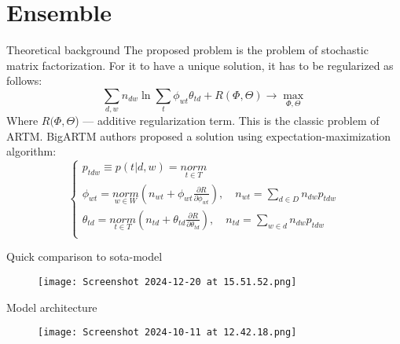 \documentclass[10pt,pdf,hyperref={unicode}]{beamer}
\begin{document}
\section{Ensemble}
\begin{frame}{Theoretical background}
    The proposed problem is the problem of stochastic matrix factorization. For it to have a unique solution, it has to be regularized as follows:
\begin{equation}
    \sum_{d, w} n_{dw} \ln \sum_{t} \phi_{wt}\theta_{td} + R(\Phi, \Theta) \rightarrow \max_{\Phi, \Theta}
    \label{likelihood}
\end{equation}
Where $R(\Phi, \Theta$) --- additive regularization term. This is the classic problem of ARTM. BigARTM authors proposed a solution using expectation-maximization algorithm:
\begin{equation}
    \begin{cases}
        p_{tdw} \equiv p(t|d, w) = \underset{t \in T}{norm} \\
        \phi_{wt} = \underset{w \in W}{norm}\left(n_{wt} + \phi_{wt}\frac{\partial R}{\partial \phi_{wt}}\right), \quad n_{wt} = \underset{d \in D}{\sum} n_{dw}p_{tdw} \\
        \theta_{td} = \underset{t \in T}{norm}\left(n_{td} + \theta_{td}\frac{\partial R}{\partial \theta_{td}}\right), \quad n_{td} = \underset{w \in d}{\sum} n_{dw}p_{tdw} \\
    \end{cases}
    \label{em}
\end{equation}
\end{frame}

\begin{frame}{Quick comparison to sota-model}
    \begin{figure}
        \centering
        \texttt{[image: Screenshot 2024-12-20 at 15.51.52.png]}
        \label{fig:enter-label}
    \end{figure}
\end{frame}

\begin{frame}{Model architecture}
    \begin{figure}
    \centering
    \texttt{[image: Screenshot 2024-10-11 at 12.42.18.png]}
    \label{fig:enter-label}
\end{figure}
\end{frame}
\end{document}
